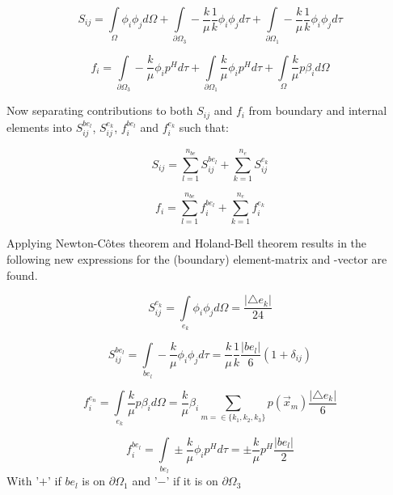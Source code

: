\documentclass[a4paper]{report}
\begin{document}
\begin{equation}
S_{ij}=\int\limits_{\Omega}\phi_i\phi_j d\Omega +\int\limits_{\partial\Omega_3}-\frac{k}{\mu}\frac{1}{k}\phi_i\phi_j d\tau + \int\limits_{\partial\Omega_1}-\frac{k}{\mu}\frac{1}{k}\phi_i\phi_j d\tau 
\end{equation}

\begin{equation}
f_i = 
\int\limits_{\partial\Omega_3}-\frac{k}{\mu}\phi_i p^H d\tau +\int\limits_{\partial\Omega_1}\frac{k}{\mu}\phi_i p^H d\tau + \int\limits_{\Omega}\frac{k}{\mu}p\beta_id\Omega
\end{equation}

Now separating contributions to both $S_{ij}$ and $f_i$ from boundary and internal elements into $S_{ij}^{be_l}$, $S_{ij}^{e_k}$, $f_i^{be_l}$ and $f_i^{e_k}$ such that:

\begin{equation}
	S_{ij} = \sum\limits_{l=1}^{n_{be}} S_{ij}^{be_{l}} + \sum\limits_{k=1}^{n_{e}} S_{ij}^{e_{k}}
\end{equation}

\begin{equation}
f_{i} = \sum\limits_{l=1}^{n_{be}} f_{i}^{be_{l}} + \sum\limits_{k=1}^{n_{e}} f_{i}^{e_{k}}
\end{equation}

Applying Newton-Côtes theorem and Holand-Bell theorem results in the following new expressions for the (boundary) element-matrix and -vector are found.

\begin{equation}
S^{e_k}_{ij}=\int\limits_{e_k}\phi_i\phi_j d\Omega= \frac{\lvert\triangle e_k \rvert}{24}
\end{equation}

\begin{equation}
S^{be_l}_{ij}=\int\limits_{be_l}-\frac{k}{\mu}\phi_i\phi_j d\tau = \frac{k}{\mu}\frac{1}{k}\frac{\lvert be_l\rvert}{6}(1+\delta_{ij})
\end{equation}

\begin{equation}
f^{e_n}_{i} = \int\limits_{e_k}\frac{k}{\mu}p\beta_i d\Omega = \frac{k}{\mu}\beta_i\sum_{m=\in\{k_1,k_2,k_3\}} p(\vec{x}_m) \frac{\lvert \triangle e_k\rvert}{6}
\end{equation}

\begin{equation}
f^{be_l}_{i}=\int\limits_{be_l}\pm \frac{k}{\mu}\phi_ip^H d\tau = \pm \frac{k}{\mu}p^H \frac{\lvert be_l\rvert}{2}
\end{equation}
With '$+$' if $be_{l}$ is on $\partial\Omega_1$ and '$-$' if it is on $\partial\Omega_3$
\vspace{5mm}
\end{document}
